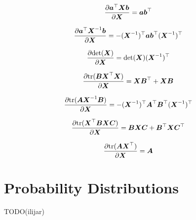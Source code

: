 \documentclass{article}
\begin{document}
\begin{align}
  \frac{\partial \vec a\T \mat X \vec b}{\partial \mat X}
    = \vec a \vec b\T
\end{align}

\begin{align}
  \frac{\partial \vec a\T \mat X\inv \vec b}{\partial \mat X}
    = - (\mat X\inv)\T \vec a \vec b\T (\mat X\inv)\T
\end{align}

\begin{align}
  \frac{\partial \determ{\mat X}}{\partial \mat X}
    = \determ{\mat X} (\mat X\inv)\T
\end{align}

\begin{align}
  \frac{\partial \tr{\mat B \mat X\T \mat X}}{\partial \mat X}
    = \mat X \mat B\T + \mat X \mat B
\end{align}

\begin{align}
  \frac{\partial \tr{\mat A \mat X\inv \mat B}}{\partial \mat X}
    = -(\mat X\inv)\T \mat A\T \mat B\T (\mat X\inv)\T
\end{align}

\begin{align}
  \frac{\partial \tr{\mat X\T \mat B \mat X \mat C}}{\partial \mat X}
    = \mat B \mat X \mat C + \mat B\T \mat X \mat C\T
\end{align}

\begin{align}
  \frac{\partial \tr{\mat A \mat X\T}}{\partial \mat X}
    = \mat A
\end{align}

\newpage
\section{Probability Distributions}
TODO(ilijar)
\end{document}
